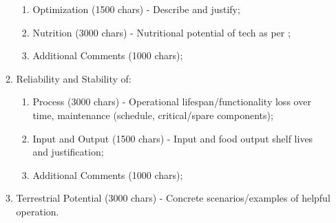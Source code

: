 \documentclass{report}
\begin{document}
\begin{appendices}
\begin{enumerate}
\begin{enumerate}
\begin{enumerate}
            \item Optimization (1500 chars) - Describe and justify;
            \item Nutrition (3000 chars) - Nutritional potential of tech as per \cite{nutrition};
            \item Additional Comments (1000 chars);
        \end{enumerate}
        \item Reliability and Stability of:
        \begin{enumerate}
            \item Process (3000 chars) - Operational lifespan/functionality loss over time, maintenance (schedule, critical/spare components);
            \item Input and Output (1500 chars) - Input and food output shelf lives and justification;
            \item Additional Comments (1000 chars);
        \end{enumerate}
        \item Terrestrial Potential (3000 chars) - Concrete scenarios/examples of helpful operation.
    \end{enumerate}
\end{enumerate}

\end{appendices}
\newpage



\end{document}
